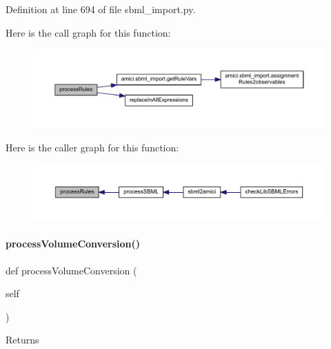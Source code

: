 Definition at line 694 of file sbml\+\_\+import.\+py.

Here is the call graph for this function\+:
\nopagebreak
\begin{figure}[H]
\begin{center}
\leavevmode
\includegraphics[width=350pt]{classamici_1_1sbml__import_1_1_sbml_importer_a7df6b4ae4e3e757bc8de5e0cc54fe16b_cgraph}
\end{center}
\end{figure}
Here is the caller graph for this function\+:
\nopagebreak
\begin{figure}[H]
\begin{center}
\leavevmode
\includegraphics[width=350pt]{classamici_1_1sbml__import_1_1_sbml_importer_a7df6b4ae4e3e757bc8de5e0cc54fe16b_icgraph}
\end{center}
\end{figure}
\mbox{\label{classamici_1_1sbml__import_1_1_sbml_importer_af2a2cbf8550d30fc0e95a875758b8262}} 
\paragraph{\texorpdfstring{process\+Volume\+Conversion()}{processVolumeConversion()}}
{\footnotesize\ttfamily def process\+Volume\+Conversion (\begin{DoxyParamCaption}\item[{}]{self }\end{DoxyParamCaption})}

\begin{DoxyReturn}{Returns}

\end{DoxyReturn}


